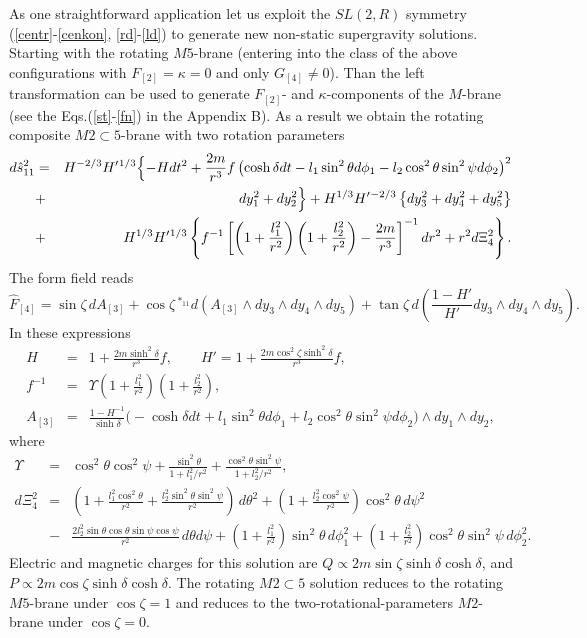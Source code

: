 \documentclass[a4paper,12pt]{article}
\begin{document}
As one straightforward application let us exploit the $SL(2,R)$
symmetry (\ref{centr}-\ref{cenkon}, \ref{rd}-\ref{ld}) to
generate new non-static supergravity solutions. Starting with the
rotating $M5$-brane \cite{CvYo97} (entering into the class of the
above configurations with $F_{[2]}=\kappa=0$ and only $G_{[4]}\ne
0$). Than the left transformation can be used to generate
$F_{[2]}$- and $\kappa$-components of the $M$-brane (see the
Eqs.(\ref{st}-\ref{fn}) in the Appendix B). As a result we obtain
the rotating composite $M2\subset 5$-brane with two rotation
parameters
\begin{eqnarray}
d\hat s_{11}^2 &=& H^{-2/3} H'{}^{1/3} \Bigl\{ - H dt^2 +
\frac{2m}{r^3} f \left( \cosh \delta dt - l_1 \sin^2\theta d\phi_1
- l_2 \cos^2\theta \sin^2\psi d\phi_2 \right)^2 \nonumber\\
&+& dy_1^2 + dy_2^2 \Bigr\} + H^{1/3} H'{}^{-2/3}
\left\{ dy_3^2 + dy_4^2 + dy_5^2\right\} \nonumber \\
&+& H^{1/3} H'{}^{1/3} \left\{ f^{-1} \left[
\left(1+\frac{l_1^2}{r^2}\right)\left(1+\frac{l_2^2}{r^2}\right)
- \frac{2m}{r^3} \right]^{-1} dr^2 + r^2 d\Xi_4^2 \right\}.
\end{eqnarray}
The form field reads
\begin{equation}
\hat F_{[4]} = \sin\zeta \, d A_{[3]} + \cos\zeta \,
{}^{\ast_{11}} d(A_{[3]}\wedge dy_3\wedge dy_4\wedge dy_5) +
\tan\zeta \, d \left(\frac{1-H'}{H'} dy_3 \wedge dy_4 \wedge dy_5
\right).
\end{equation}
In these expressions
\begin{eqnarray}
H &=& 1 + \frac{2m\sinh^2\delta}{r^3} f, \qquad
H' = 1 + \frac{2m \cos^2\zeta \sinh^2\delta}{r^3} f, \\
f^{-1} &=& \Upsilon \left(1+\frac{l_1^2}{r^2}\right)
\left(1+\frac{l_2^2}{r^2}\right), \\
A_{[3]} &=& \frac{1-H^{-1}}{\sinh\delta} \bigl( -\cosh\delta dt +
l_1 \sin^2\theta d\phi_1 + l_2 \cos^2\theta \sin^2\psi d\phi_2
\bigr) \wedge dy_1 \wedge dy_2,
\end{eqnarray}
where
\begin{eqnarray}
\Upsilon &=& \cos^2\theta \cos^2\psi +
\frac{\sin^2\theta}{1+l_1^2/r^2}
+ \frac{\cos^2\theta \sin^2\psi}{1+l_2^2/r^2}, \\
d\Xi_4^2 &=& \left( 1 + \frac{l_1^2 \cos^2\theta}{r^2} +
\frac{l_2^2 \sin^2\theta \sin^2\psi}{r^2} \right) \, d\theta^2 +
\left(1+\frac{l_2^2\cos^2\psi}{r^2}\right)\cos^2\theta \, d\psi^2
\nonumber\\
&-& \frac{2l_2^2\sin\theta\cos\theta\sin\psi\cos\psi}{r^2} \,
d\theta d\psi + \left(1\!+\!\frac{l_1^2}{r^2}\right)\sin^2\theta
\, d\phi_1^2 + \left(1\!+\!\frac{l_2^2}{r^2}\right)\cos^2\theta
\sin^2\psi \,d\phi_2^2. \nonumber
\end{eqnarray}
Electric and magnetic charges for this solution are $Q \propto 2m
\sin\zeta \sinh\delta \cosh\delta$, and $P \propto 2m \cos\zeta
\sinh\delta \cosh\delta$. The rotating $M2\subset 5$ solution
reduces to the rotating $M5$-brane under $\cos\zeta=1$ and
reduces to the two-rotational-parameters $M2$-brane under
$\cos\zeta=0$.
\end{document}
